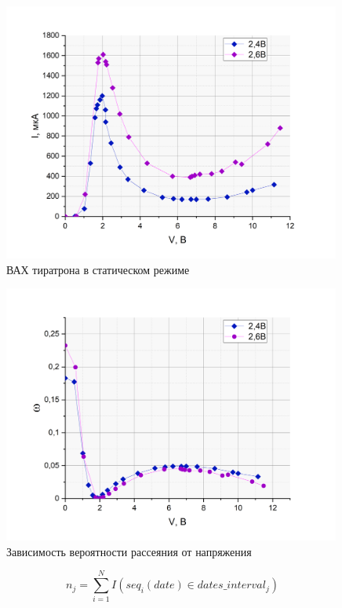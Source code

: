 \documentclass[a4paper, 12pt]{article}
\begin{document}
\begin{figure}[h!]
    \begin{center}
    \includegraphics[width=0.99\textwidth]{Рамзауэр.png}
    \end{center}
    \caption{ВАХ тиратрона в статическом режиме}
\end{figure}
\begin{figure}[h!]
    \begin{center}
    \includegraphics[width=0.99\textwidth]{w.png}
    \end{center}
    \caption{Зависимость вероятности рассеяния от напряжения}
\end{figure}

$$
n_j = \sum_{i=1}^{N} I(seq_i(date) \in dates\_interval_j)
$$
\end{document}
